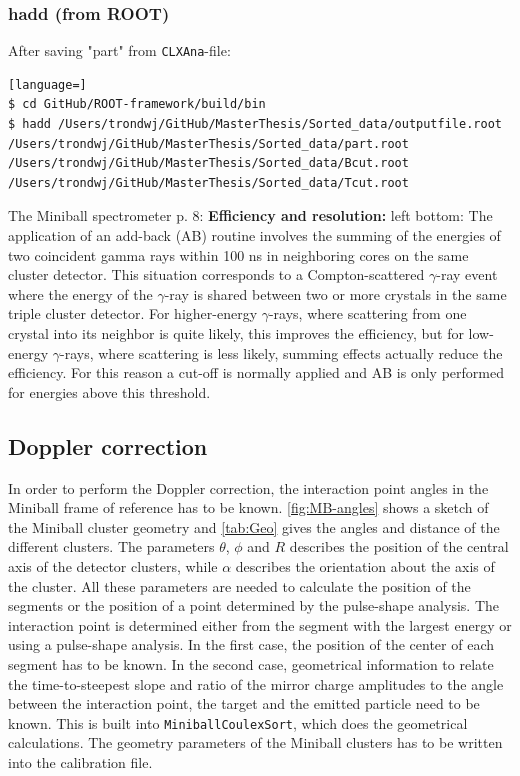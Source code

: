 \documentclass[twoside,english]{uiofysmaster/uiofysmaster}
\newcommand{\ga}{$\gamma$}
\begin{document}
\subsubsection{hadd (from ROOT)}
After saving "part" from \texttt{CLXAna}-file:
\begin{lstlisting}[language=]
$ cd GitHub/ROOT-framework/build/bin
$ hadd /Users/trondwj/GitHub/MasterThesis/Sorted_data/outputfile.root /Users/trondwj/GitHub/MasterThesis/Sorted_data/part.root /Users/trondwj/GitHub/MasterThesis/Sorted_data/Bcut.root /Users/trondwj/GitHub/MasterThesis/Sorted_data/Tcut.root 
\end{lstlisting}

\bigskip


The Miniball spectrometer \cite{MB-spect} \newline
p. 8: \newline
\textbf{Efficiency and resolution:}
left bottom: \newline
The application of an add-back (AB) routine involves the summing of the energies of two coincident gamma rays within 100 ns in neighboring cores on the same cluster detector. This situation corresponds to a Compton-scattered \ga-ray event where the energy of the \ga-ray is shared between two or more crystals in the same triple cluster detector. For higher-energy \ga-rays, where scattering from one crystal into its neighbor is quite likely, this improves the efficiency, but for low-energy \ga-rays, where scattering is less likely, summing effects actually reduce the efficiency. For this reason a cut-off is normally applied and AB is only performed for energies above this threshold. \newline


\subsection{Doppler correction}

In order to perform the Doppler correction, the interaction point angles in the Miniball frame of reference has to be known. 
\autoref{fig:MB-angles} shows a sketch of the Miniball cluster geometry and \autoref{tab:Geo} gives the angles and distance of the different clusters.
The parameters $\theta$, $\phi$ and $R$ describes the position of the central axis of the detector clusters, while $\alpha$ describes the orientation about the axis of the cluster. All these parameters are needed to calculate the position of the segments or the position of a point determined by the pulse-shape analysis. 
The interaction point is determined either from the segment with the largest energy or using a pulse-shape analysis. 
In the first case, the position of the center of each segment has to be known.
In the second case, geometrical information to relate the time-to-steepest slope and ratio of the mirror charge amplitudes to the angle between the interaction point, the target and the emitted particle need to be known. 
This is built into \texttt{MiniballCoulexSort}, which does the geometrical calculations. 
The geometry parameters of the Miniball clusters has to be written into the calibration file. 
\end{document}
